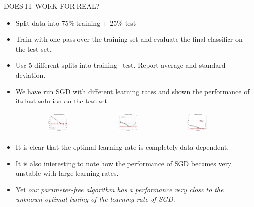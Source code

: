 \documentclass[final,t,serif,mathserif]{beamer}
\def\spazioo{\vspace{-0.3cm}}
\begin{document}
\begin{frame}{}
\begin{columns}[t]
\begin{column}{.33\linewidth}
    \begin{block}{DOES IT WORK FOR REAL?}
      \spazioo
      \begin{itemize}
        \item Split data into 75\% training + 25\% test
        \item Train with one pass over the training set and evaluate the final classifier on the test set.
        \item Use 5 different splits into training+test. Report average and standard deviation.
        \item We have run SGD with different learning rates and shown the performance of its last solution on the test set.
       \end{itemize}
      \begin{figure}[t]
	\centering
	\begin{tabular}{ccc}
	\includegraphics[width=0.32\textwidth]{../figs/yearPredictionMSD_kt_train_test-crop.pdf} &
        \includegraphics[width=0.32\textwidth]{../figs/cpusmall_kt_train_test-crop.pdf} &
        \includegraphics[width=0.32\textwidth]{../figs/cadata_kt_train_test-crop.pdf}
	\end{tabular}
      \end{figure}
      \begin{itemize}
        \item It is clear that the optimal learning rate is completely data-dependent.
        \item It is also interesting to note how the performance of SGD becomes very unstable with large learning rates. \item Yet \emph{our parameter-free algorithm has a performance very close to the unknown optimal tuning of the learning rate of SGD}.
       \end{itemize}
      \spazioo
    \end{block}



\end{column}
\end{columns}
\end{frame}
\end{document}
